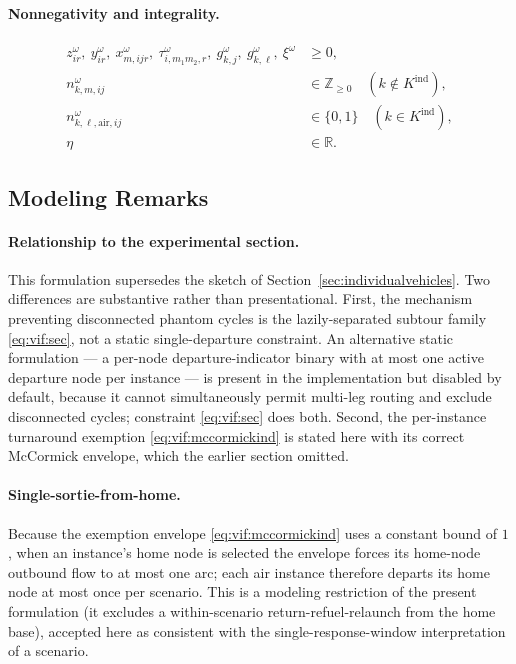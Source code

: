 \paragraph{Nonnegativity and integrality.}
\begin{align}
z^\omega_{ir},\ y^\omega_{ir},\ x^\omega_{m,ijr},\
  \tau^\omega_{i,m_1m_2,r},\ g^\omega_{k,j},\ g^\omega_{k,\ell},\ \xi^\omega
  &\geq 0, \label{eq:vif:nonneg} \\
n^\omega_{k,m,ij} &\in \mathbb{Z}_{\geq 0}
  \quad (k \notin K^{\mathrm{ind}}), \label{eq:vif:int} \\
n^\omega_{k,\ell,\text{air},ij} &\in \{0,1\}
  \quad (k \in K^{\mathrm{ind}}), \label{eq:vif:bin} \\
\eta &\in \mathbb{R}. \label{eq:vif:etafree}
\end{align}

\subsection{Modeling Remarks}
\label{sec:vif:remarks}

\paragraph{Relationship to the experimental section.}
This formulation supersedes the sketch of
Section~\ref{sec:individualvehicles}. Two differences are substantive rather
than presentational. First, the mechanism preventing disconnected phantom
cycles is the lazily-separated subtour family \eqref{eq:vif:sec}, not a static
single-departure constraint. An alternative static formulation --- a per-node
departure-indicator binary with at most one active departure node per instance
--- is present in the implementation but disabled by default, because it cannot
simultaneously permit multi-leg routing and exclude disconnected cycles;
constraint \eqref{eq:vif:sec} does both. Second, the per-instance turnaround
exemption \eqref{eq:vif:mccormickind} is stated here with its correct McCormick
envelope, which the earlier section omitted.

\paragraph{Single-sortie-from-home.}
Because the exemption envelope \eqref{eq:vif:mccormickind} uses a constant
bound of $1$, when an instance's home node is selected the envelope forces its
home-node outbound flow to at most one arc; each air instance therefore
departs its home node at most once per scenario. This is a modeling
restriction of the present formulation (it excludes a within-scenario
return-refuel-relaunch from the home base), accepted here as consistent with
the single-response-window interpretation of a scenario.

